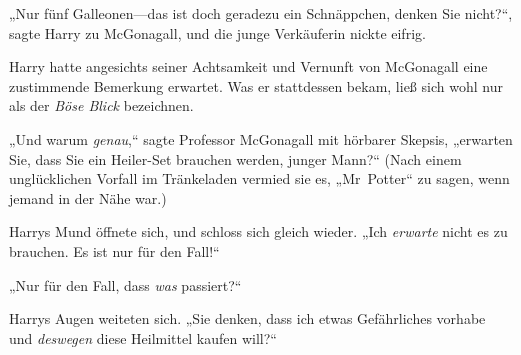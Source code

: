 „Nur fünf Galleonen—das ist doch geradezu ein Schnäppchen, denken Sie nicht?“, sagte Harry zu McGonagall, und die junge Verkäuferin nickte eifrig.


Harry hatte angesichts seiner Achtsamkeit und Vernunft von McGonagall eine zustimmende Bemerkung erwartet. Was er stattdessen bekam, ließ sich wohl nur als der \emph{Böse Blick} bezeichnen.

„Und warum \emph{genau},“ sagte Professor McGonagall mit hörbarer Skepsis, „erwarten Sie, dass Sie ein Heiler-Set brauchen werden, junger Mann?“ (Nach einem unglücklichen Vorfall im Tränkeladen vermied sie es, „Mr~Potter“ zu sagen, wenn jemand in der Nähe war.)

Harrys Mund öffnete sich, und schloss sich gleich wieder. „Ich \emph{erwarte} nicht es zu brauchen. Es ist nur für den Fall!“

„Nur für den Fall, dass \emph{was} passiert?“

Harrys Augen weiteten sich. „Sie denken, dass ich etwas Gefährliches vorhabe und \emph{deswegen} diese Heilmittel kaufen will?“

